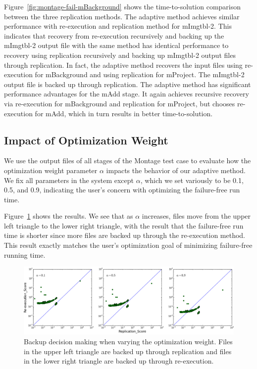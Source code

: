 \documentclass{sig-alternate}
\newcommand{\katznote}[1]{ {\textcolor{blue}    { ***Dan:      #1 }}}
\newcommand{\kylenote}[1]{{\textcolor{orange}    { ***Kyle:      #1 }}}
\newcommand{\katznote}[1]{}
\newcommand{\kylenote}[1]{}
\begin{document}
Figure~\ref{fig:montage-fail-mBackground} shows the time-to-solution comparison between the three replication methods. 
The adaptive method achieves similar performance with re-execution and replication method for mImgtbl-2. 
This indicates that recovery from re-execution recursively and backing up the mImgtbl-2 output file with the same method has identical performance to recovery using replication recursively and backing up mImgtbl-2 output files through replication. 
In fact, the adaptive method recovers the input files using re-execution for mBackground and using replication for mProject. The mImgtbl-2 output file is backed up through replication.
The adaptive method has significant performance advantages for the mAdd stage.
It again achieves recursive recovery via re-execution for mBackground and replication for mProject,
but chooses re-execution for mAdd, which in turn results in better time-to-solution.



\subsection{Impact of Optimization Weight}
\label{sec:Perf:Weight}
We use the output files of all stages of the Montage test case to evaluate how the optimization weight parameter $\alpha$ impacts the behavior of our adaptive method. %
We fix all parameters in the system except $\alpha$, which we set variously to be 0.1, 0.5, and 0.9, indicating the user's concern with optimizing the failure-free run time.


Figure~\ref{fig:weight} shows the results. We see that as $\alpha$ increases, files move from the upper left triangle to the lower right triangle, with the result that the failure-free run time is shorter since more files are backed up through the re-execution method.
This result exactly matches the user's optimization goal of minimizing failure-free running time.

\begin{figure}[ht]
	\begin{center}
		\includegraphics[width=160mm]{pictures/weight}
		\vspace{-10pt}
		\caption{Backup decision making when varying the optimization weight. Files in the upper left triangle are backed up through replication and files in the lower right triangle are backed up through re-execution.
		\label{fig:weight}}
  	\end{center}
\end{figure}
\end{document}
